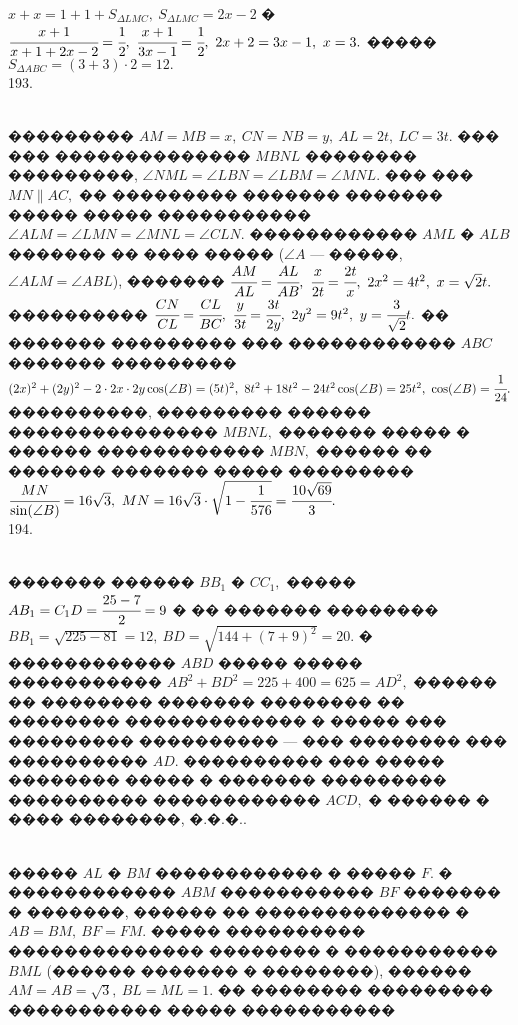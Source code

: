 \documentclass[12pt]{article}
\begin{document}
$x+x=1+1+S_{\Delta LMC},\ S_{\Delta LMC}=2x-2$ � $\cfrac{x+1}{x+1+2x-2}=\cfrac{1}{2},\ \cfrac{x+1}{3x-1}=\cfrac{1}{2},\ 2x+2=3x-1,\ x=3.$ ����� $S_{\Delta ABC}=(3+3)\cdot2=12.$\\
193. \begin{figure}[ht!]
\end{figure}\\
��������� $AM=MB=x,\ CN=NB=y,\ AL=2t,\ LC=3t.$ ��� ��� �������������� $MBNL$ �������� ���������, $\angle NML=\angle LBN=\angle LBM=\angle MNL.$ ��� ��� $MN\parallel AC,$ �� ��������� ������� ������� ����� ����� ����������� $\angle ALM=\angle LMN=\angle MNL=\angle CLN.$ ������������ $AML$ � $ALB$ ������� �� ���� ����� ($\angle A$ --- �����, $\angle ALM=\angle ABL$), ������� $\cfrac{AM}{AL}=\cfrac{AL}{AB},\ \cfrac{x}{2t}=\cfrac{2t}{x},\ 2x^2=4t^2,\ x=\sqrt{2}t.$ ���������� $\cfrac{CN}{CL}=\cfrac{CL}{BC},\ \cfrac{y}{3t}=\cfrac{3t}{2y},\ 2y^2=9t^2,\ y=\cfrac{3}{\sqrt{2}}t.$ �� ������� ��������� ��� ������������ $ABC$ ������� ��������� $(2x)^2+(2y)^2-2\cdot2x\cdot2y\cos(\angle B)=(5t)^2,\
8t^2+18t^2-24t^2\cos(\angle B)=25t^2,\ \cos(\angle B)=\cfrac{1}{24}.$ ����������, ��������� ������ ��������������� $MBNL,$ ������� ����� � ������ ������������ $MBN,$ ������ �� ������� ������� ����� ��������� $\cfrac{MN}{\sin(\angle B)}=16\sqrt{3},\ MN=16\sqrt{3}\cdot\sqrt{1-\cfrac{1}{576}}=\cfrac{10\sqrt{69}}{3}.$\\
194. \begin{figure}[ht!]
\end{figure}\\
������� ������ $BB_1$ � $CC_1,$ ����� $AB_1=C_1D=\cfrac{25-7}{2}=9$ � �� ������� �������� $BB_1=\sqrt{225-81}=12,\ BD=\sqrt{144+(7+9)^2}=20.$ � ������������ $ABD$ ����� ����� ����������� $AB^2+BD^2=225+400=625=AD^2,$ ������ �� �������� ������� �������� �� �������� ������������� � ����� ��� ��������� ���������� --- ��� �������� ��� ���������� $AD.$ ���������� ��� ����� �������� ����� � ������� ��������� ���������� ������������ $ACD,$ � ������ � ���� ��������, �.�.�.\newpage\noindent
195. \begin{figure}[ht!]
\end{figure}\\
����� $AL$ � $BM$ ������������ � ����� $F.$ � ������������ $ABM$ ����������� $BF$ ������� � �������, ������ �� �������������� � $AB=BM,\ BF=FM.$ ����� ���������� �������������� �������� � ����������� $BML$ (������ ������� � ��������), ������ $AM=AB=\sqrt{3},\ BL=ML=1.$ �� �������� ��������� ����������� ����� �����������
\end{document}
